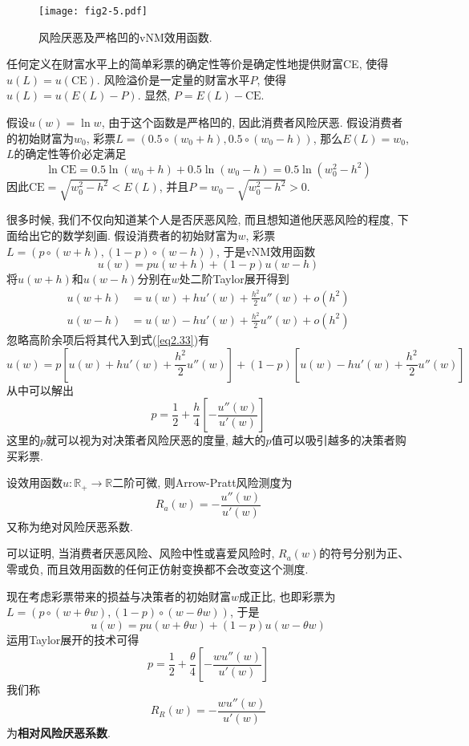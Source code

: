 \documentclass[cn, 12pt, math=mtpro2, bibstyle=apa, blue]{elegantbook}
\newcommand{\R}{\mathbb{R}}
\begin{document}
\begin{figure}[htbp!]
  \centering
  \texttt{[image: fig2-5.pdf]}
  \caption{风险厌恶及严格凹的vNM效用函数.}\label{fig2.5}
\end{figure}

\begin{definition}[确定性等价与风险溢价]
任何定义在财富水平上的简单彩票的确定性等价是确定性地提供财富CE, 使得$u(L)=u(\text{CE})$. 风险溢价是一定量的财富水平$P$, 使得$u(L)=u(E(L)-P)$. 显然, $P=E(L)-\text{CE}$.
\end{definition}

\begin{example}
假设$u(w)=\ln w$, 由于这个函数是严格凹的, 因此消费者风险厌恶. 假设消费者的初始财富为$w_0$, 彩票$L=(0.5\circ (w_0+h), 0.5\circ (w_0-h))$, 那么$E(L)=w_0$, $L$的确定性等价必定满足
$$\ln \text{CE}=0.5\ln (w_0+h)+0.5\ln (w_0-h)=0.5\ln (w_0^2-h^2)$$
因此$\text{CE}=\sqrt{w_0^2-h^2}<E(L)$, 并且$P=w_0-\sqrt{w_0^2-h^2}>0$.
\end{example}

很多时候, 我们不仅向知道某个人是否厌恶风险, 而且想知道他厌恶风险的程度, 下面给出它的数学刻画. 假设消费者的初始财富为$w$, 彩票$L=(p\circ (w+h), (1-p)\circ (w-h))$, 于是vNM效用函数
\begin{equation}\label{eq2.33}
  u(w)=pu(w+h)+(1-p)u(w-h)
\end{equation}
将$u(w+h)$和$u(w-h)$分别在$w$处二阶Taylor展开得到
\begin{align*}
u(w+h)&=u(w)+hu'(w)+\frac{h^2}{2}u''(w)+o(h^2) \\
u(w-h)&=u(w)-hu'(w)+\frac{h^2}{2}u''(w)+o(h^2)
\end{align*}
忽略高阶余项后将其代入到式(\ref{eq2.33})有
$$u(w)=p\left[u(w)+hu'(w)+\frac{h^2}{2}u''(w)\right]+(1-p)\left[u(w)-hu'(w)+\frac{h^2}{2}u''(w)\right]$$
从中可以解出
$$p=\frac{1}{2}+\frac{h}{4}\left[-\frac{u''(w)}{u'(w)}\right]$$
这里的$p$就可以视为对决策者风险厌恶的度量, 越大的$p$值可以吸引越多的决策者购买彩票.
\begin{definition}
设效用函数$u:\R_+\to \R$二阶可微, 则Arrow-Pratt风险测度为
$$R_a(w)=-\frac{u''(w)}{u'(w)}$$
又称为绝对风险厌恶系数.
\end{definition}
可以证明, 当消费者厌恶风险、风险中性或喜爱风险时, $R_a(w)$的符号分别为正、零或负, 而且效用函数的任何正仿射变换都不会改变这个测度.

现在考虑彩票带来的损益与决策者的初始财富$w$成正比, 也即彩票为$L=(p\circ (w+\theta w),(1-p)\circ (w-\theta w))$, 于是
$$u(w)=pu(w+\theta w)+(1-p)u(w-\theta w)$$
运用Taylor展开的技术可得
$$p=\frac{1}{2}+\frac{\theta}{4}\left[-\frac{wu''(w)}{u'(w)}\right]$$
我们称
$$R_R(w)=-\frac{wu''(w)}{u'(w)}$$
为\textbf{相对风险厌恶系数}.
\end{document}
